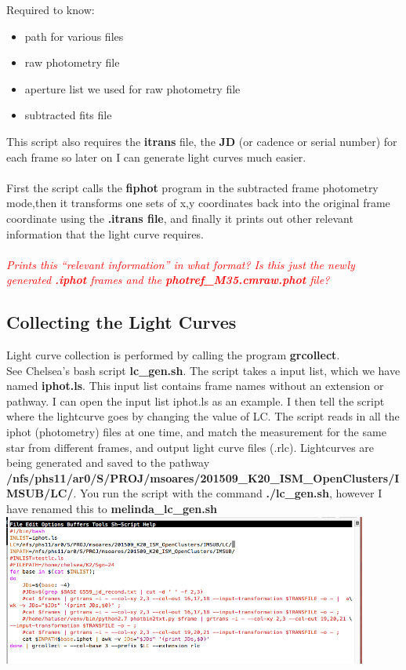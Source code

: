 \documentclass[11pt,letterpaper]{book} %
\begin{document}
Required to know:
\begin{itemize}
\item path for various files
\item raw photometry file
\item aperture list we used for raw photometry file
\item subtracted fits file
\end{itemize}
This script also requires the \textbf{itrans} file, the \textbf{JD} (or cadence or serial number) for each frame so later on I can generate light curves much easier. \\ \\
First the script calls the \textbf{fiphot} program in the subtracted frame photometry mode,then it transforms one sets of x,y coordinates back into the original frame coordinate using the \textbf{.itrans file}, and finally it prints out other relevant information that the light curve requires. \\ \\
 \textcolor{red}{\textit{Prints this ``relevant information'' in what format? Is this just the newly generated \textbf{.iphot} frames and the \textbf{photref\_M35.cmraw.phot} file?}}

\subsection*{Collecting the Light Curves}
Light curve collection is performed by calling the program \textbf{grcollect}. \\
See Chelsea's bash script \textbf{lc\_gen.sh}. 
The script takes a input list, which we have named \textbf{iphot.ls}. This input list contains frame names without an extension or pathway.
I can open the input list iphot.ls as an example. 
I then tell the script where the lightcurve goes by changing the value of LC.
The script reads in all the iphot (photometry) files at one time, and match the measurement for the same star from different frames, and output light curve files (.rlc).
Lightcurves are being generated and saved to the pathway \textbf{/nfs/phs11/ar0/S/PROJ/msoares/201509\_K20\_ISM\_OpenClusters/IMSUB/LC/}.
You run the script with the command \textbf{./lc\_gen.sh}, however I have renamed this to \textbf{melinda\_lc\_gen.sh}\\
\includegraphics[width=0.9\textwidth]{lcgen.png}\\
\\ \\ 
\end{document}
